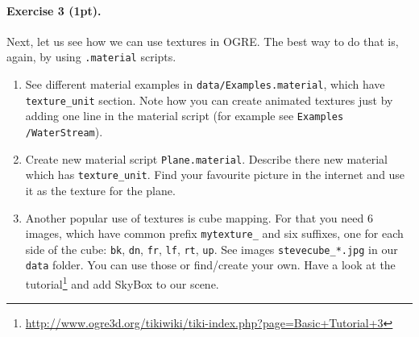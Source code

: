 \documentclass{article}
\newenvironment{exercise}[2]{\paragraph{Exercise #1 (#2pt).} }{
\medskip}
\begin{document}
\begin{exercise}{3}{1}
Next, let us see how we can use textures in OGRE. The best way to do that is, again, by using \verb#.material# scripts.
\begin{enumerate}
	\item See different material examples in \verb#data/Examples.material#, which have \verb#texture_unit# section. Note how you can create animated textures just by adding one line in the material script (for example see \verb#Examples# \verb#/WaterStream#).
	\item Create new material script \verb#Plane.material#. Describe there new material which has \verb#texture_unit#. Find your favourite picture in the internet and use it as the texture for the plane.
	\item Another popular use of textures is cube mapping. For that you need 6 images, which have common prefix \verb#mytexture_# and six suffixes, one for each side of the cube: \verb#bk#, \verb#dn#, \verb#fr#, \verb#lf#, \verb#rt#, \verb#up#. See images \verb#stevecube_*.jpg# in our \verb#data# folder. You can use those or find/create your own. Have a look at the tutorial\footnote{\url{http://www.ogre3d.org/tikiwiki/tiki-index.php?page=Basic+Tutorial+3}} and add SkyBox to our scene.
\end{enumerate}
\end{exercise}
\end{document}
